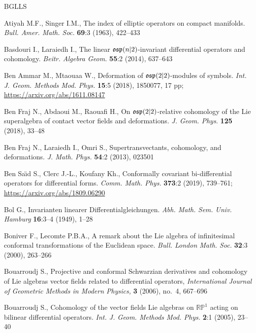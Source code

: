 \documentclass[12pt,a4paper]{amsart}
\theoremstyle{thm}
\theoremstyle{definition}
\begin{document}
\def\eightit{\it}
\def\bib{\bf}

\begin{thebibliography}{BGLLS}

Atiyah M.F., Singer I.M., The index of elliptic operators on compact manifolds.
\textit{Bull. Amer. Math. Soc.} \textbf{69}:3 (1963), 422--433


Basdouri I., Laraiedh I., The linear ${\mathfrak{osp}}(n|2)$-invariant differential operators
and cohomology. \textit{Beitr. Algebra Geom.} \textbf{55}:2 (2014), 637--643

Ben Ammar M., Mtaouaa W., Deformation of ${\mathfrak{osp}}(2|2)$-modules of symbols.
\textit{Int. J. Geom. Methods Mod. Phys.} \textbf{15}:5 (2018), 1850077, 17 pp;
\url{https://arxiv.org/abs/1611.08147}

Ben Fraj N., Abdaoui M., Raouafi H., On ${\mathfrak{osp}}(2|2)$-relative cohomology of the Lie
superalgebra of contact vector fields and deformations. \textit{J. Geom. Phys.}
\textbf{125} (2018), 33--48

Ben Fraj N., Laraiedh I., Omri S., Supertransvectants, cohomology, and deformations.
\textit{J. Math. Phys.} \textbf{54}:2 (2013), 023501

Ben Sa\"\i d S., Clerc J.-L., Koufany Kh., Conformally covariant bi-differential operators
for differential forms. \textit{Comm. Math. Phys.} \textbf{373}:2 (2019), 739--761;
\url{https://arxiv.org/abs/1809.06290}

Bol G., Invarianten linearer Differentialgleichungen. \textit{Abh. Math. Sem. Univ. Hamburg}
\textbf{16}:3--4 (1949), 1--28

Boniver F., Lecomte P.B.A., A remark about the Lie algebra of infinitesimal conformal
transformations of the Euclidean space. \textit{Bull. London Math. Soc.} \textbf{32}:3
(2000), 263--266

 Bouarroudj S., Projective and conformal Schwarzian derivatives and cohomology of Lie algebras vector fields related to differential operators,
 \textit{International Journal of Geometric Methods in Modern Physics,} 
 \textbf{3} (2006), no.~4, 667--696

Bouarroudj S., Cohomology of the vector fields Lie algebras on $\mathbb{RP}^1$ acting on
bilinear differential operators. \textit{Int. J. Geom. Methods Mod. Phys.} \textbf{2}:1
(2005), 23--40


\end{thebibliography}
\end{document}
